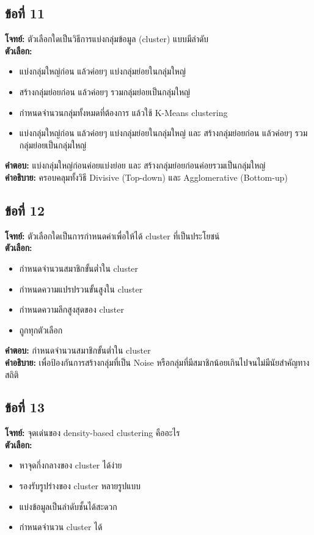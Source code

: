 \documentclass[12pt]{article}
\begin{document}
\subsection*{ข้อที่ 11}
\textbf{โจทย์:} ตัวเลือกใดเป็นวิธีการแบ่งกลุ่มข้อมูล (cluster) แบบมีลำดับ\\
\textbf{ตัวเลือก:}
\begin{itemize}
    \item แบ่งกลุ่มใหญ่ก่อน แล้วค่อยๆ แบ่งกลุ่มย่อยในกลุ่มใหญ่
    \item สร้างกลุ่มย่อยก่อน แล้วค่อยๆ รวมกลุ่มย่อยเป็นกลุ่มใหญ่
    \item กำหนดจำนวนกลุ่มทั้งหมดที่ต้องการ แล้วใช้ K-Means clustering
    \item แบ่งกลุ่มใหญ่ก่อน แล้วค่อยๆ แบ่งกลุ่มย่อยในกลุ่มใหญ่ และ สร้างกลุ่มย่อยก่อน แล้วค่อยๆ รวมกลุ่มย่อยเป็นกลุ่มใหญ่
\end{itemize}

\textbf{คำตอบ:} แบ่งกลุ่มใหญ่ก่อนค่อยแบ่งย่อย และ สร้างกลุ่มย่อยก่อนค่อยรวมเป็นกลุ่มใหญ่\\
\textbf{คำอธิบาย:} ครอบคลุมทั้งวิธี Divisive (Top-down) และ Agglomerative (Bottom-up)

\subsection*{ข้อที่ 12}
\textbf{โจทย์:} ตัวเลือกใดเป็นการกำหนดค่าเพื่อให้ได้ cluster ที่เป็นประโยชน์\\
\textbf{ตัวเลือก:}
\begin{itemize}
    \item กำหนดจำนวนสมาชิกขั้นต่ำใน cluster
    \item กำหนดความแปรปรวนขั้นสูงใน cluster
    \item กำหนดความลึกสูงสุดของ cluster
    \item ถูกทุกตัวเลือก
\end{itemize}

\textbf{คำตอบ:} กำหนดจำนวนสมาชิกขั้นต่ำใน cluster\\
\textbf{คำอธิบาย:} เพื่อป้องกันการสร้างกลุ่มที่เป็น Noise หรือกลุ่มที่มีสมาชิกน้อยเกินไปจนไม่มีนัยสำคัญทางสถิติ

\subsection*{ข้อที่ 13}
\textbf{โจทย์:} จุดเด่นของ density-based clustering คืออะไร\\
\textbf{ตัวเลือก:}
\begin{itemize}
    \item หาจุดกึ่งกลางของ cluster ได้ง่าย
    \item รองรับรูปร่างของ cluster หลายรูปแบบ
    \item แบ่งข้อมูลเป็นลำดับชั้นได้สะดวก
    \item กำหนดจำนวน cluster ได้
\end{itemize}
\end{document}
